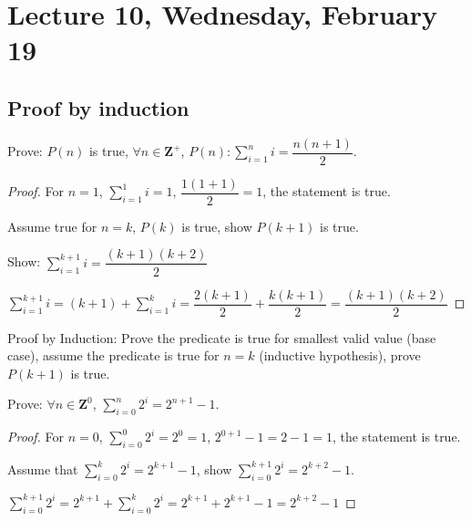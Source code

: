 \section{Lecture 10, Wednesday, February 19}

\subsection{Proof by induction}

\begin{ex}

Prove: $P(n)$ is true, $\forall n \in \mathbf{Z}^+$, $P(n): \sum_{i = 1}^n i = \dfrac{n(n + 1)}{2}$.

\end{ex}

\begin{proof}

For $n = 1$, $\sum_{i = 1}^1 i = 1$, $\dfrac{1(1 + 1)}{2} = 1$, the statement is true.

Assume true for $n = k$, $P(k)$ is true, show $P(k + 1)$ is true.

Show: $\sum_{i = 1}^{k + 1} i = \dfrac{(k + 1)(k + 2)}{2}$

$\sum_{i = 1}^{k + 1} i = (k + 1) + \sum_{i = 1}^k i = \dfrac{2(k + 1)}{2} + \dfrac{k(k + 1)}{2} = \dfrac{(k + 1)(k + 2)}{2}$

\end{proof}

\begin{defn}

Proof by Induction: Prove the predicate is true for smallest valid value (base case), assume the predicate is true for $n = k$ (inductive hypothesis), prove $P(k + 1)$ is true.

\end{defn}

\begin{ex}

Prove: $\forall n \in \mathbf{Z}^0$, $\sum_{i = 0}^n 2^i = 2^{n + 1} - 1$.

\end{ex}

\begin{proof}

For $n = 0$, $\sum_{i = 0}^0 2^i = 2^0 = 1$, $2^{0 + 1} - 1 = 2 - 1 = 1$, the statement is true.

Assume that $\sum_{i = 0}^k 2^i = 2^{k + 1} - 1$, show $\sum_{i = 0}^{k + 1} 2^i = 2^{k + 2} - 1$.

$\sum_{i = 0}^{k + 1} 2^i = 2^{k + 1} + \sum_{i = 0}^k 2^i = 2^{k + 1} + 2^{k + 1} - 1 = 2^{k + 2} - 1$

\end{proof}

